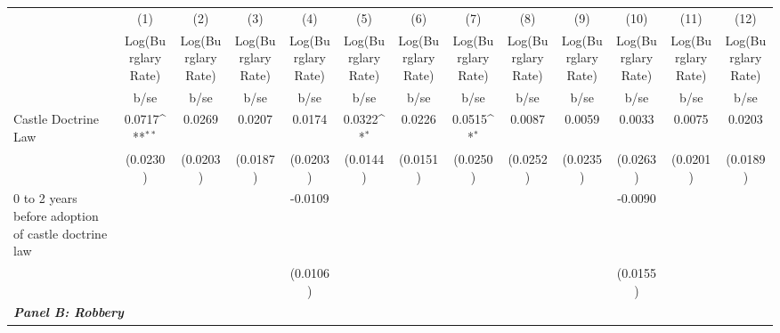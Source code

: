 {
\def\sym#1{\ifmmode^{#1}\else\(^{#1}\)\fi}
\begin{tabular}{l*{12}{c}}
\hline\hline
&\multicolumn{1}{c}{(1)}&\multicolumn{1}{c}{(2)}&\multicolumn{1}{c}{(3)}&\multicolumn{1}{c}{(4)}&\multicolumn{1}{c}{(5)}&\multicolumn{1}{c}{(6)}&\multicolumn{1}{c}{(7)}&\multicolumn{1}{c}{(8)}&\multicolumn{1}{c}{(9)}&\multicolumn{1}{c}{(10)}&\multicolumn{1}{c}{(11)}&\multicolumn{1}{c}{(12)}\\
&\multicolumn{1}{c}{Log(Burglary Rate)}&\multicolumn{1}{c}{Log(Burglary Rate)}&\multicolumn{1}{c}{Log(Burglary Rate)}&\multicolumn{1}{c}{Log(Burglary Rate)}&\multicolumn{1}{c}{Log(Burglary Rate)}&\multicolumn{1}{c}{Log(Burglary Rate)}&\multicolumn{1}{c}{Log(Burglary Rate)}&\multicolumn{1}{c}{Log(Burglary Rate)}&\multicolumn{1}{c}{Log(Burglary Rate)}&\multicolumn{1}{c}{Log(Burglary Rate)}&\multicolumn{1}{c}{Log(Burglary Rate)}&\multicolumn{1}{c}{Log(Burglary Rate)}\\
&        b/se         &        b/se         &        b/se         &        b/se         &        b/se         &        b/se         &        b/se         &        b/se         &        b/se         &        b/se         &        b/se         &        b/se         \\
\hline
Castle Doctrine Law &      0.0717\sym{**} &      0.0269         &      0.0207         &      0.0174         &      0.0322\sym{*}  &      0.0226         &      0.0515\sym{*}  &      0.0087         &      0.0059         &      0.0033         &      0.0075         &      0.0203         \\
&    (0.0230)         &    (0.0203)         &    (0.0187)         &    (0.0203)         &    (0.0144)         &    (0.0151)         &    (0.0250)         &    (0.0252)         &    (0.0235)         &    (0.0263)         &    (0.0201)         &    (0.0189)         \\
0 to 2 years before adoption of castle doctrine law&                     &                     &                     &     -0.0109         &                     &                     &                     &                     &                     &     -0.0090         &                     &                     \\
&                     &                     &                     &    (0.0106)         &                     &                     &                     &                     &                     &    (0.0155)         &                     &                     \\
\hline
\multicolumn{12}{l}{\linebreak \textbf{\textit{Panel B: Robbery}}} \\

\end{tabular}}
